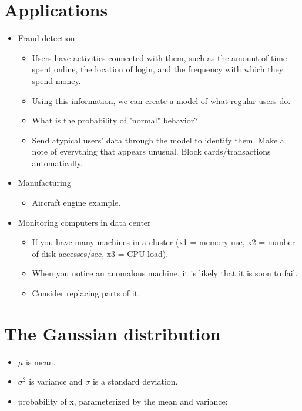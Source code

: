 \documentclass{article}
\begin{document}
\section*{Applications}
\begin{itemize}
  \item Fraud detection

        \begin{itemize}
          \item Users have activities connected with them, such as the amount of time spent online, the location of login, and the frequency with which they spend money.
          \item Using this information, we can create a model of what regular users do.
          \item What is the probability of "normal" behavior?
          \item Send atypical users' data through the model to identify them. Make a note of everything that appears unusual. Block cards/transactions automatically.
        \end{itemize}

  \item Manufacturing

        \begin{itemize}
          \item Aircraft engine example.

        \end{itemize}

  \item Monitoring computers in data center

        \begin{itemize}
          \item If you have many machines in a cluster (x1 = memory use, x2 = number of disk accesses/sec, x3 = CPU load).
          \item When you notice an anomalous machine, it is likely that it is soon to fail.
          \item Consider replacing parts of it.
        \end{itemize}
\end{itemize}

\section*{The Gaussian distribution}

\begin{itemize}
  \item $\mu$ is mean.
  \item $\sigma^2$ is variance and $\sigma$ is a standard deviation.
  \item probability of x, parameterized by the mean and variance:
\end{itemize}
\end{document}
